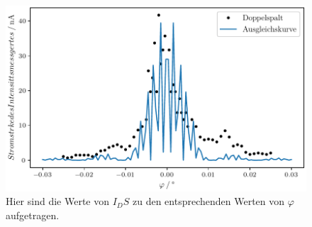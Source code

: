 \begin{figure}[H]
  \centering
  \includegraphics{plot2.pdf}
  \caption{Hier sind die Werte von $I_DS$ zu den entsprechenden Werten von $\varphi$ aufgetragen.}
  \label{fig:Doppelspalt}
\end{figure}

